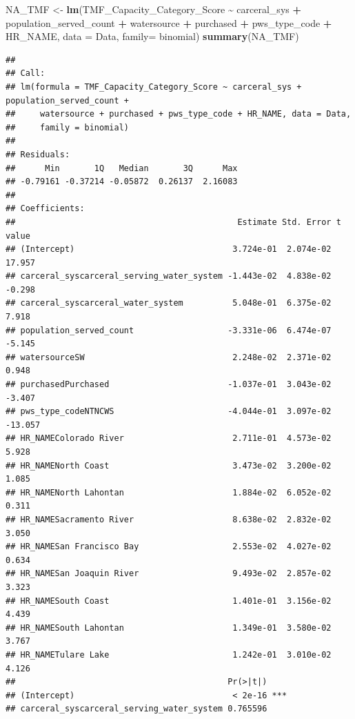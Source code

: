 \documentclass[
]{article}
\newenvironment{Shaded}{\begin{snugshade}}{\end{snugshade}}
\newcommand{\AttributeTok}[1]{\textcolor[rgb]{0.13,0.29,0.53}{#1}}
\newcommand{\FunctionTok}[1]{\textcolor[rgb]{0.13,0.29,0.53}{\textbf{#1}}}
\newcommand{\NormalTok}[1]{#1}
\newcommand{\OtherTok}[1]{\textcolor[rgb]{0.56,0.35,0.01}{#1}}
\newcommand{\SpecialCharTok}[1]{\textcolor[rgb]{0.81,0.36,0.00}{\textbf{#1}}}
\begin{document}
\begin{Shaded}
\begin{Highlighting}[]
\NormalTok{NA\_TMF }\OtherTok{\textless{}{-}} \FunctionTok{lm}\NormalTok{(TMF\_Capacity\_Category\_Score }\SpecialCharTok{\textasciitilde{}}\NormalTok{ carceral\_sys }\SpecialCharTok{+}\NormalTok{ population\_served\_count }\SpecialCharTok{+}\NormalTok{ watersource }\SpecialCharTok{+}\NormalTok{ purchased }\SpecialCharTok{+}\NormalTok{ pws\_type\_code }\SpecialCharTok{+}\NormalTok{ HR\_NAME, }\AttributeTok{data =}\NormalTok{ Data, }\AttributeTok{family=}\NormalTok{ binomial)}
\FunctionTok{summary}\NormalTok{(NA\_TMF)}
\end{Highlighting}
\end{Shaded}

\begin{verbatim}
## 
## Call:
## lm(formula = TMF_Capacity_Category_Score ~ carceral_sys + population_served_count + 
##     watersource + purchased + pws_type_code + HR_NAME, data = Data, 
##     family = binomial)
## 
## Residuals:
##      Min       1Q   Median       3Q      Max 
## -0.79161 -0.37214 -0.05872  0.26137  2.16083 
## 
## Coefficients:
##                                             Estimate Std. Error t value
## (Intercept)                                3.724e-01  2.074e-02  17.957
## carceral_syscarceral_serving_water_system -1.443e-02  4.838e-02  -0.298
## carceral_syscarceral_water_system          5.048e-01  6.375e-02   7.918
## population_served_count                   -3.331e-06  6.474e-07  -5.145
## watersourceSW                              2.248e-02  2.371e-02   0.948
## purchasedPurchased                        -1.037e-01  3.043e-02  -3.407
## pws_type_codeNTNCWS                       -4.044e-01  3.097e-02 -13.057
## HR_NAMEColorado River                      2.711e-01  4.573e-02   5.928
## HR_NAMENorth Coast                         3.473e-02  3.200e-02   1.085
## HR_NAMENorth Lahontan                      1.884e-02  6.052e-02   0.311
## HR_NAMESacramento River                    8.638e-02  2.832e-02   3.050
## HR_NAMESan Francisco Bay                   2.553e-02  4.027e-02   0.634
## HR_NAMESan Joaquin River                   9.493e-02  2.857e-02   3.323
## HR_NAMESouth Coast                         1.401e-01  3.156e-02   4.439
## HR_NAMESouth Lahontan                      1.349e-01  3.580e-02   3.767
## HR_NAMETulare Lake                         1.242e-01  3.010e-02   4.126
##                                           Pr(>|t|)    
## (Intercept)                                < 2e-16 ***
## carceral_syscarceral_serving_water_system 0.765596    

\end{verbatim}
\end{document}
